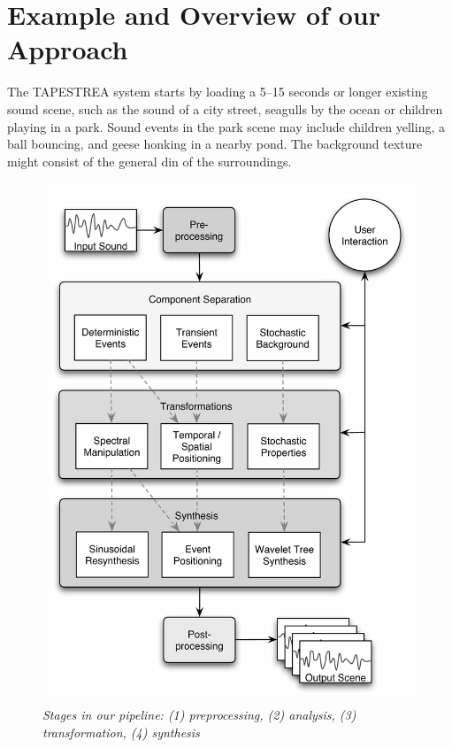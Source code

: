 \documentclass[twoside]{article}
\begin{document}
\section{Example and Overview of our Approach}

The TAPESTREA system starts by loading a 5--15 seconds or longer existing sound scene, 
such as the sound of a city street, seagulls by the ocean or children playing in a park. 
Sound events in the park scene may include children yelling,  
a ball bouncing, and geese honking in a nearby pond. The background texture might 
consist of the general din of the surroundings. 

\begin{figure}[t]
\centering
\includegraphics[width=.93\columnwidth]{ourpipelineb.jpg}
\caption{\it Stages in our pipeline: (1) preprocessing, (2) analysis, 
(3) transformation, (4) synthesis}
\label{fig:pipeline}
\end{figure}
\end{document}
